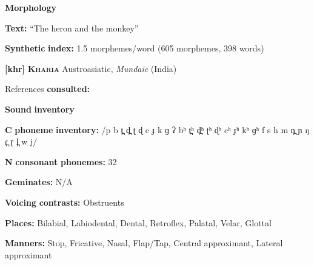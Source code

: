 \begin{styleBody}
\textbf{Morphology}
\end{styleBody}

\begin{styleBody}
\textbf{Text:} “The heron and the monkey” \citep[516-520]{Donohue1999}
\end{styleBody}

\begin{styleBody}
\textbf{Synthetic} \textbf{index:} 1.5 morphemes/word (605 morphemes, 398 words)
\end{styleBody}

\begin{styleBody}
\textbf{[khr]}   \textbf{\textsc{Kharia}}    Austroasiatic, \textit{Mundaic} (India)
\end{styleBody}

\begin{styleBody}
References \textbf{consulted:} \citet{Peterson2011}
\end{styleBody}

\begin{styleBody}
\textbf{Sound} \textbf{inventory}
\end{styleBody}

\begin{styleBody}
\textbf{C} \textbf{phoneme} \textbf{inventory:} /p b t̪ d̪ ʈ ɖ c ɟ k ɡ ʔ bʰ t̪ʰ d̪ʰ ʈʰ ɖʰ cʰ ɟʰ kʰ ɡʰ f s h m n̪ ɲ ŋ ɾ̪ ɽ l̪ w j/
\end{styleBody}

\begin{styleBody}
\textbf{N} \textbf{consonant} \textbf{phonemes:} 32
\end{styleBody}

\begin{styleBody}
\textbf{Geminates:} N/A
\end{styleBody}

\begin{styleBody}
\textbf{Voicing} \textbf{contrasts:} Obstruents
\end{styleBody}

\begin{styleBody}
\textbf{Places:} Bilabial, Labiodental, Dental, Retroflex, Palatal, Velar, Glottal
\end{styleBody}

\begin{styleBody}
\textbf{Manners:} Stop, Fricative, Nasal, Flap/Tap, Central approximant, Lateral approximant
\end{styleBody}

